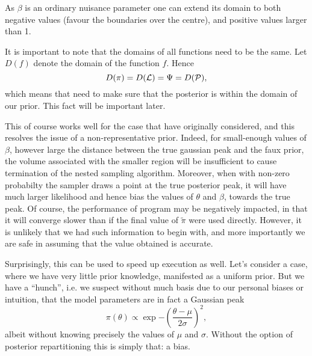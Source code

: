 \documentclass[usenatbib]{mnras}
\begin{document}
As \(\beta\) is an ordinary nuisance parameter one can extend its
domain to both negative values (favour the boundaries over the
centre), and positive values larger than 1.

It is important to note that the domains of all functions need to
be the same. Let \(D(f)\) denote the domain of the function
\(f\). Hence 
\begin{equation}
  D(\pi) = D({\cal L}) = \Psi = D({\cal P}),
\end{equation} 
which means that need to make sure that the posterior is within the
domain of our prior. This fact will be important later.\label{domain-discussion}

This of course works well for the case that
\citeauthor{chen-ferroz-hobson} have originally considered, and this
resolves the issue of a non-representative prior. Indeed, for
small-enough values of \(\beta\), however large the distance
between the true gaussian peak and the faux prior, the volume
associated with the smaller region will be insufficient to cause
termination of the nested sampling algorithm. Moreover, when with
non-zero probabilty the sampler draws a point at the true posterior
peak, it will have much larger likelihood and hence bias the values
of \(\theta\) and \(\beta\), towards the true peak. Of course, the
performance of program may be negatively impacted, in that it will
converge slower than if the final value of \(\tilde{\pi}\) were
used directly. However, it is unlikely that we had such information
to begin with, and more importantly we are safe in assuming that
the value obtained is accurate.


Surprisingly, this can be used to speed up execution as well. Let's
consider a case, where we have very little prior knowledge,
manifested as a uniform prior. But we have a ``hunch'', i.e. we
suspect without much basis due to our personal biases or intuition,
that the model parameters are in fact a Gaussian peak
\begin{equation}
 \pi (\theta) \propto \exp{ -\left(\frac{\theta - \mu}{2\sigma}\right)^{2}},
\end{equation}
albeit without knowing precisely the values of \(\mu\) and
\(\sigma\). Without the option of posterior repartitioning this is
simply that: a bias. 
\end{document}
